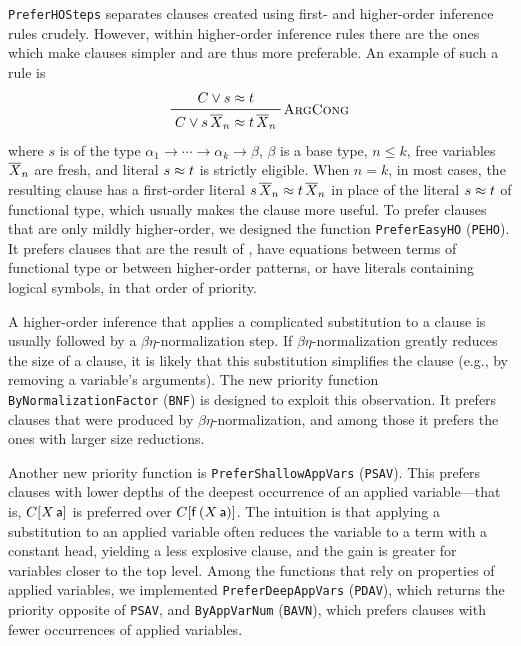 \documentclass[smallcondensed,draft]{svjour3}     %
\begin{document}
\verb|PreferHOSteps| separates clauses created using first-
and higher-order inference rules crudely. However, within higher-order
inference rules there are the ones which make clauses simpler and are thus more
preferable. An example of such a rule is
%
\[\namedinference{\infname{ArgCong}}{C \lor s \eq t}{C \lor s \, \tuplen{X}
\eq t \, \tuplen{X}}\]
%
where $s$ is of the type $\alpha_1 \rightarrow \cdots \rightarrow \alpha_k
\rightarrow \beta$, $\beta$ is a base type, $n \leq k$, free variables
$\overline{X}_{n}$ are fresh, and literal $s \approx t$ is strictly eligible. When $n =
k$, in most cases, the resulting clause has a first-order literal $s \, \overline{X}_{n}
\approx t \, \overline{X}_{n}$ in place of the literal $s \approx t$ of functional type, which usually makes the clause more useful. To
prefer clauses that are only mildly higher-order, we designed the function
\verb|PreferEasyHO| (\verb|PEHO|). It prefers clauses that are the result of
, have equations between terms of functional type or
between higher-order patterns, or have literals containing logical symbols, in that
order of priority.

A higher-order inference that applies a complicated substitution to a clause is
usually followed by a $\beta\eta$-normalization step. If
$\beta\eta$-normalization greatly reduces the size of a clause, it is likely
that this substitution simplifies the clause (e.g., by removing a variable's
arguments). The new priority function \verb|ByNormalizationFactor| (\verb|BNF|)
is designed to exploit this observation. It prefers clauses that were produced
by $\beta\eta$-normalization, and among those it prefers the ones with larger
size reductions.

Another new priority function is \verb|PreferShallowAppVars| (\verb|PSAV|). This
prefers clauses with lower depths of the deepest occurrence of an applied
variable---that is, $C[X \, \mathsf{a}]$ is preferred over $C[\mathsf{f}\,(X \,
\mathsf{a})]$. The intuition is that applying a substitution to an applied
variable often reduces the variable to a term with a constant head,
yielding a less explosive clause, and the gain is greater for variables closer
to the top level.  Among the functions that rely
on properties of applied variables, we implemented \verb|PreferDeepAppVars|
(\verb|PDAV|), which returns the priority opposite of \verb|PSAV|, and
\verb|ByAppVarNum| (\verb|BAVN|), which prefers clauses with fewer occurrences
of applied variables.



\end{document}
